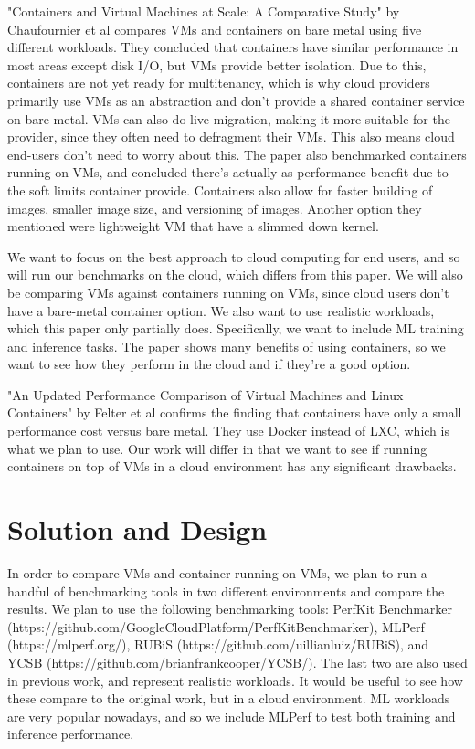 \documentclass[11pt]{article}
\begin{document}
"Containers and Virtual Machines at Scale: A Comparative Study" by Chaufournier et al compares VMs and containers on bare metal using five different workloads. They concluded that containers have similar performance in most areas except disk I/O, but VMs provide better isolation. Due to this, containers are not yet ready for multitenancy, which is why cloud providers primarily use VMs as an abstraction and don't provide a shared container service on bare metal. VMs can also do live migration, making it more suitable for the provider, since they often need to defragment their VMs. This also means cloud end-users don't need to worry about this. The paper also benchmarked containers running on VMs, and concluded there's actually as performance benefit due to the soft limits container provide. Containers also allow for faster building of images, smaller image size, and versioning of images. Another option they mentioned were lightweight VM that have a slimmed down kernel.

We want to focus on the best approach to cloud computing for end users, and so will run our benchmarks on the cloud, which differs from this paper. We will also be comparing VMs against containers running on VMs, since cloud users don't have a bare-metal container option. We also want to use realistic workloads, which this paper only partially does. Specifically, we want to include ML training and inference tasks. The paper shows many benefits of using containers, so we want to see how they perform in the cloud and if they're a good option.

"An Updated Performance Comparison of Virtual Machines and Linux Containers" by Felter et al confirms the finding that containers have only a small performance cost versus bare metal. They use Docker instead of LXC, which is what we plan to use. Our work will differ in that we want to see if running containers on top of VMs in a cloud environment has any significant drawbacks.

\section{Solution and Design}

In order to compare VMs and container running on VMs, we plan to run a handful of benchmarking tools in two different environments and compare the results. We plan to use the following benchmarking tools: PerfKit Benchmarker (https://github.com/GoogleCloudPlatform/PerfKitBenchmarker), MLPerf (https://mlperf.org/), RUBiS (https://github.com/uillianluiz/RUBiS), and YCSB (https://github.com/brianfrankcooper/YCSB/). The last two are also used in previous work, and represent realistic workloads. It would be useful to see how these compare to the original work, but in a cloud environment. ML workloads are very popular nowadays, and so we include MLPerf to test both training and inference performance.
\end{document}
